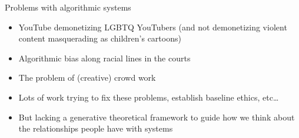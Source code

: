 \documentclass[presentation]{subfiles}
\begin{document}
\begin{frame}{Problems with algorithmic systems}
\begin{itemize}
  \item YouTube demonetizing LGBTQ YouTubers (and not demonetizing violent content masquerading as children's cartoons)
  \item Algorithmic bias along racial lines in the courts
  \item The problem of (creative) crowd work 
  \item<+-> Lots of work trying to fix these problems, establish baseline ethics, etc\dots
  \item<+-> But lacking a generative theoretical framework to guide how we think about the relationships people have with systems
\end{itemize}
\end{frame}



  
\end{document}
